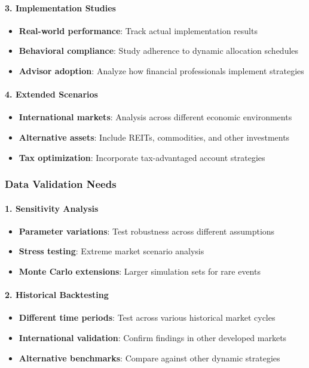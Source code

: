 \documentclass[11pt,letterpaper]{article}
\begin{document}
\paragraph{3. Implementation Studies}
\begin{itemize}
\item \textbf{Real-world performance}: Track actual implementation results
\item \textbf{Behavioral compliance}: Study adherence to dynamic allocation schedules
\item \textbf{Advisor adoption}: Analyze how financial professionals implement strategies
\end{itemize}

\paragraph{4. Extended Scenarios}
\begin{itemize}
\item \textbf{International markets}: Analysis across different economic environments
\item \textbf{Alternative assets}: Include REITs, commodities, and other investments
\item \textbf{Tax optimization}: Incorporate tax-advantaged account strategies
\end{itemize}

\subsubsection{Data Validation Needs}

\paragraph{1. Sensitivity Analysis}
\begin{itemize}
\item \textbf{Parameter variations}: Test robustness across different assumptions
\item \textbf{Stress testing}: Extreme market scenario analysis
\item \textbf{Monte Carlo extensions}: Larger simulation sets for rare events
\end{itemize}

\paragraph{2. Historical Backtesting}
\begin{itemize}
\item \textbf{Different time periods}: Test across various historical market cycles
\item \textbf{International validation}: Confirm findings in other developed markets
\item \textbf{Alternative benchmarks}: Compare against other dynamic strategies
\end{itemize}
\end{document}
